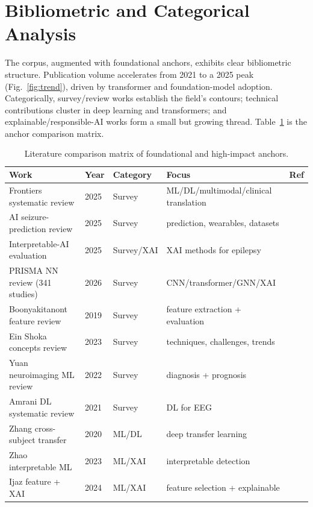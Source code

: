 \section{Bibliometric and Categorical Analysis}
The corpus, augmented with foundational anchors, exhibits clear bibliometric structure. Publication volume accelerates from 2021 to a 2025 peak (Fig.~\ref{fig:trend}), driven by transformer and foundation-model adoption. Categorically, survey/review works \citep{rev_frontiers25,rev_seizpred25,rev_interp25,rev_prisma26,boonyakitanont19,einshoka23,yuan22,amrani21} establish the field's contours; technical contributions cluster in deep learning and transformers; and explainable/responsible-AI works \citep{gabeff21,raab22,vieira23,rathod22,mansour20,patil26} form a small but growing thread. Table~\ref{tab:litmatrix} is the anchor comparison matrix.
\begin{table}[t]\centering\caption{Literature comparison matrix of foundational and high-impact anchors.}\label{tab:litmatrix}
\footnotesize\begin{tabular}{lllll}\toprule
Work & Year & Category & Focus & Ref\\\midrule
Frontiers systematic review & 2025 & Survey & ML/DL/multimodal/clinical translation & \cite{rev_frontiers25}\\
AI seizure-prediction review & 2025 & Survey & prediction, wearables, datasets & \cite{rev_seizpred25}\\
Interpretable-AI evaluation & 2025 & Survey/XAI & XAI methods for epilepsy & \cite{rev_interp25}\\
PRISMA NN review (341 studies) & 2026 & Survey & CNN/transformer/GNN/XAI & \cite{rev_prisma26}\\
Boonyakitanont feature review & 2019 & Survey & feature extraction + evaluation & \cite{boonyakitanont19}\\
Ein Shoka concepts review & 2023 & Survey & techniques, challenges, trends & \cite{einshoka23}\\
Yuan neuroimaging ML review & 2022 & Survey & diagnosis + prognosis & \cite{yuan22}\\
Amrani DL systematic review & 2021 & Survey & DL for EEG & \cite{amrani21}\\
Zhang cross-subject transfer & 2020 & ML/DL & deep transfer learning & \cite{zhang20}\\
Zhao interpretable ML & 2023 & ML/XAI & interpretable detection & \cite{zhao23}\\
Ijaz feature + XAI & 2024 & ML/XAI & feature selection + explainable & \cite{ijaz24}\\

\end{tabular}
\end{table}
